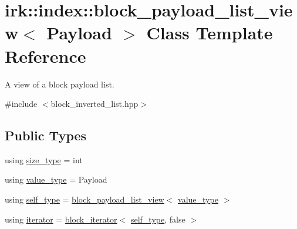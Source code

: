 \hypertarget{classirk_1_1index_1_1block__payload__list__view}{}\section{irk\+:\+:index\+:\+:block\+\_\+payload\+\_\+list\+\_\+view$<$ Payload $>$ Class Template Reference}
\label{classirk_1_1index_1_1block__payload__list__view}


A view of a block payload list.  




{\ttfamily \#include $<$block\+\_\+inverted\+\_\+list.\+hpp$>$}

\subsection*{Public Types}
\begin{DoxyCompactItemize}
\item 
using \mbox{\hyperlink{classirk_1_1index_1_1block__payload__list__view_aa7545a3c9095406fb90e0dca7b146b60}{size\+\_\+type}} = int
\item 
using \mbox{\hyperlink{classirk_1_1index_1_1block__payload__list__view_a739d436330ba54972ef70a5cd3f57ef3}{value\+\_\+type}} = Payload
\item 
using \mbox{\hyperlink{classirk_1_1index_1_1block__payload__list__view_a29e1995bbc64a8512bacf6c110f24f9e}{self\+\_\+type}} = \mbox{\hyperlink{classirk_1_1index_1_1block__payload__list__view}{block\+\_\+payload\+\_\+list\+\_\+view}}$<$ \mbox{\hyperlink{classirk_1_1index_1_1block__payload__list__view_a739d436330ba54972ef70a5cd3f57ef3}{value\+\_\+type}} $>$
\item 
using \mbox{\hyperlink{classirk_1_1index_1_1block__payload__list__view_a3cbb6ab331804c87e830be1380a3c2b2}{iterator}} = \mbox{\hyperlink{classirk_1_1index_1_1block__iterator}{block\+\_\+iterator}}$<$ \mbox{\hyperlink{classirk_1_1index_1_1block__payload__list__view_a29e1995bbc64a8512bacf6c110f24f9e}{self\+\_\+type}}, false $>$
\end{DoxyCompactItemize}
